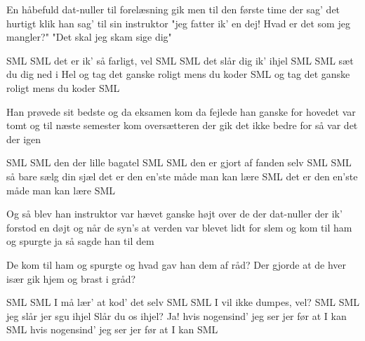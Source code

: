En håbefuld dat-nuller
til forelæsning gik
men til den første time
der sag' det hurtigt klik
han sag' til sin instruktor
"jeg fatter ik' en dej!
Hvad er det som jeg mangler?"
"Det skal jeg skam sige dig"


SML SML
det er ik' så farligt, vel
SML SML
det slår dig ik' ihjel
SML SML
sæt du dig ned i Hel
og tag det ganske roligt mens du koder SML
og tag det ganske roligt mens du koder SML

Han prøvede sit bedste
og da eksamen kom
da fejlede han ganske
for hovedet var tomt
og til næste semester
kom oversætteren
der gik det ikke bedre
for så var det der igen

SML SML
den der lille bagatel
SML SML
den er gjort af fanden selv
SML SML
så bare sælg din sjæl
det er den en'ste måde man kan lære SML
det er den en'ste måde man kan lære SML

Og så blev han instruktor
var hævet ganske højt
over de der dat-nuller
der ik' forstod en døjt
og når de syn's at verden
var blevet lidt for slem
og kom til ham og spurgte
ja så sagde han til dem

De kom til ham og spurgte og hvad gav han dem af råd?
Der gjorde at de hver især gik hjem og brast i gråd?

SML SML
I må lær' at kod' det selv
SML SML
I vil ikke dumpes, vel?
SML SML
jeg slår jer sgu ihjel
Slår du os ihjel?
Ja!
hvis nogensind' jeg ser jer før at I kan SML
hvis nogensind' jeg ser jer før at I kan SML
